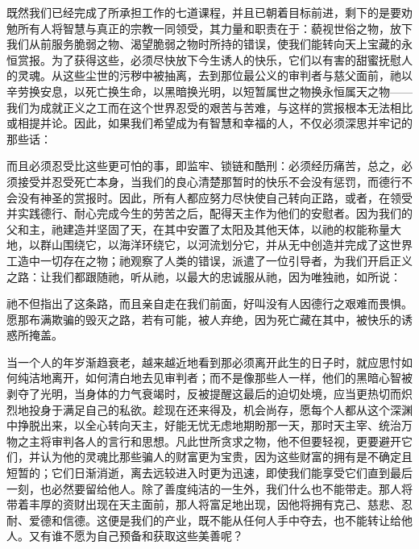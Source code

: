 既然我们已经完成了所承担工作的七道课程，并且已朝着目标前进，剩下的是要劝勉所有人将智慧与真正的宗教一同领受，其力量和职责在于：藐视世俗之物，放下我们从前服务脆弱之物、渴望脆弱之物时所持的错误，使我们能转向天上宝藏的永恒赏报。为了获得这些，必须尽快放下今生诱人的快乐，它们以有害的甜蜜抚慰人的灵魂。从这些尘世的污秽中被抽离，去到那位最公义的审判者与慈父面前，祂以辛劳换安息，以死亡换生命，以黑暗换光明，以短暂属世之物换永恒属天之物——我们为成就正义之工而在这个世界忍受的艰苦与苦难，与这样的赏报根本无法相比或相提并论。因此，如果我们希望成为有智慧和幸福的人，不仅必须深思并牢记的那些话：\par

\par

而且必须忍受比这些更可怕的事，即监牢、锁链和酷刑：必须经历痛苦，总之，必须接受并忍受死亡本身，当我们的良心清楚那暂时的快乐不会没有惩罚，而德行不会没有神圣的赏报时。因此，所有人都应努力尽快使自己转向正路，或者，在领受并实践德行、耐心完成今生的劳苦之后，配得天主作为他们的安慰者。因为我们的父和主，祂建造并坚固了天，在其中安置了太阳及其他天体，以祂的权能称量大地，以群山围绕它，以海洋环绕它，以河流划分它，并从无中创造并完成了这世界工造中一切存在之物；祂观察了人类的错误，派遣了一位引导者，为我们开启正义之路：让我们都跟随祂，听从祂，以最大的忠诚服从祂，因为唯独祂，如所说：\par

\par

祂不但指出了这条路，而且亲自走在我们前面，好叫没有人因德行之艰难而畏惧。愿那布满欺骗的毁灭之路，若有可能，被人弃绝，因为死亡藏在其中，被快乐的诱惑所掩盖。\par

当一个人的年岁渐趋衰老，越来越近地看到那必须离开此生的日子时，就应思忖如何纯洁地离开，如何清白地去见审判者；而不是像那些人一样，他们的黑暗心智被剥夺了光明，当身体的力气衰竭时，反被提醒这最后的迫切处境，应当更热切而炽烈地投身于满足自己的私欲。趁现在还来得及，机会尚存，愿每个人都从这个深渊中挣脱出来，以全心转向天主，好能无忧无虑地期盼那一天，那时天主宰、统治万物之主将审判各人的言行和思想。凡此世所贪求之物，他不但要轻视，更要避开它们，并认为他的灵魂比那些骗人的财富更为宝贵，因为这些财富的拥有是不确定且短暂的；它们日渐消逝，离去远较进入时更为迅速，即使我们能享受它们直到最后一刻，也必然要留给他人。除了善度纯洁的一生外，我们什么也不能带走。那人将带着丰厚的资财出现在天主面前，那人将富足地出现，因他将拥有克己、慈悲、忍耐、爱德和信德。这便是我们的产业，既不能从任何人手中夺去，也不能转让给他人。又有谁不愿为自己预备和获取这些美善呢？\par

